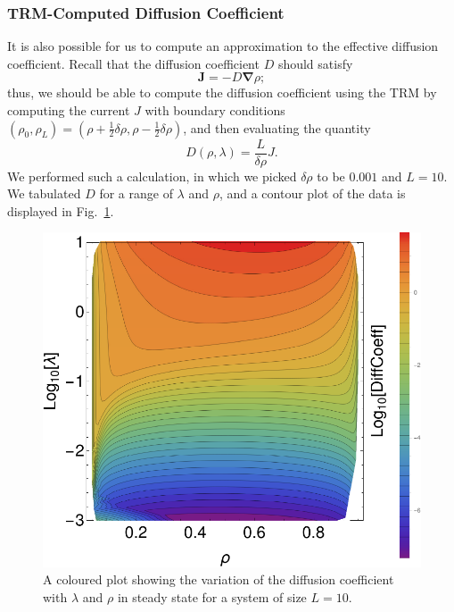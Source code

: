 \subsubsection{TRM-Computed Diffusion Coefficient}
It is also possible for us to compute an approximation to the effective diffusion coefficient.
Recall that the diffusion coefficient $D$ should satisfy
\begin{equation}
 \mathbf{J} = -D \mathbf{\nabla} \rho ;
\end{equation}
thus, we should be able to compute the diffusion coefficient using the TRM by computing the current $J$
with boundary conditions $(\rho_0, \rho_L) = (\rho+\frac{1}{2}\delta\rho, \rho-\frac{1}{2}\delta\rho)$,
and then evaluating the quantity
\begin{equation}
 D(\rho, \lambda) = \frac{L}{\delta \rho} J.
\end{equation}
We performed such a calculation, in which we picked $\delta \rho$ to be $0.001$ and $L=10$. We tabulated
$D$ for a range of $\lambda$ and $\rho$, and a contour plot of the data is displayed in 
Fig.~\ref{fig:TRMDiffCoeff}.
 \begin{figure}[h!]
 \caption[The variation of the diffusion coefficient of a system of size $L=10$ with respect to $\lambda$
 and $\rho$.]{\label{fig:TRMDiffCoeff} 
A coloured plot showing the variation of the diffusion coefficient with $\lambda$ and $\rho$
in steady state for a 
system of size $L=10$.
 }
  \begin{center}
 \includegraphics[width=1.0\textwidth]{TRM/images/TRMDiffCoeff}
  \end{center}
\end{figure}
